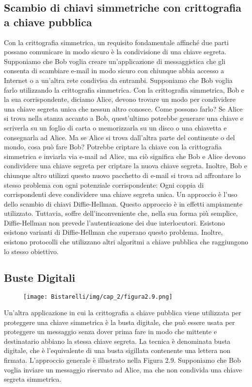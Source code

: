 \subsection{Scambio di chiavi simmetriche con crittografia a chiave pubblica}
Con la crittografia simmetrica, un requisito fondamentale affinché due parti possano comunicare in modo sicuro è la condivisione di una chiave segreta. Supponiamo che Bob voglia creare un'applicazione di messaggistica che gli consenta di scambiare e-mail in modo sicuro con chiunque abbia accesso a Internet o a un'altra rete condivisa da entrambi. Supponiamo che Bob voglia farlo utilizzando la crittografia simmetrica. Con la crittografia simmetrica, Bob e la sua corrispondente, diciamo Alice, devono trovare un modo per condividere una chiave segreta unica che nessun altro conosce. Come possono farlo? Se Alice si trova nella stanza accanto a Bob, quest'ultimo potrebbe generare una chiave e scriverla su un foglio di carta o memorizzarla su un disco o una chiavetta e consegnarla ad Alice. Ma se Alice si trova dall'altra parte del continente o del mondo, cosa può fare Bob? Potrebbe criptare la chiave con la crittografia simmetrica e inviarla via e-mail ad Alice, ma ciò significa che Bob e Alice devono condividere una chiave segreta per criptare la nuova chiave segreta. Inoltre, Bob e chiunque altro utilizzi questo nuovo pacchetto di e-mail si trova ad affrontare lo stesso problema con ogni potenziale corrispondente: Ogni coppia di corrispondenti deve condividere una chiave segreta unica. Un approccio è l'uso dello scambio di chiavi Diffie-Hellman. Questo approccio è in effetti ampiamente utilizzato. Tuttavia, soffre dell'inconveniente che, nella sua forma più semplice, Diffie-Hellman non prevede l'autenticazione dei due interlocutori. Esistono esistono varianti di Diffie-Hellman che superano questo problema. Inoltre, esistono protocolli che utilizzano altri algoritmi a chiave pubblica che raggiungono lo stesso obiettivo.
\subsection{Buste Digitali}

\begin{figure}[H]
	\centering
    \texttt{[image: Bistarelli/img/cap\_2/figura2.9.png]}
\end{figure}


Un'altra applicazione in cui la crittografia a chiave pubblica viene utilizzata per proteggere una chiave simmetrica è la busta digitale, che può essere usata per proteggere un messaggio senza dover prima fare in modo che mittente e destinatario abbiano la stessa chiave segreta. La tecnica è denominata busta digitale, che è l'equivalente di una busta sigillata contenente una lettera non firmata. L'approccio generale è illustrato nella Figura 2.9. Supponiamo che Bob voglia inviare un messaggio riservato ad Alice, ma che non condivida una chiave segreta simmetrica. 

